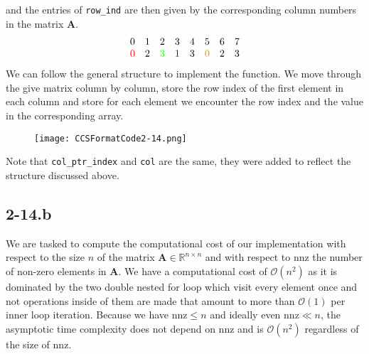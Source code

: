 \documentclass{article}
\begin{document}
and the entries of \verb|row_ind| are then given by the corresponding column numbers in the matrix $\mathbf{A}$.
\begin{equation*}
    \begin{matrix}
        0 & 1 & 2 & 3 & 4 & 5 & 6 & 7 \\
        \color{red}0\color{black} & 2 & \color{green}3\color{black} & \color{blue}1\color{black} & 3 & \color{orange}0\color{black} & 2 & 3
    \end{matrix}
\end{equation*}
We can follow the general structure to implement the function. We move through the give matrix column by column, store the row index of the first element in each column and store for each element we encounter the row index and the value in the corresponding array.
\begin{figure}[!hbt]
    \centering
\texttt{[image: CCSFormatCode2-14.png]}
\end{figure}

\noindent Note that \verb|col_ptr_index| and \verb|col| are the same, they were added to reflect the structure discussed above.
\subsection*{2-14.b}
We are tasked to compute the computational cost of our implementation with respect to the size $n$ of the matrix $\mathbf{A}\in \mathbb{R}^{n \times n}$ and with respect to $\mathrm{nnz}$ the number of non-zero elements in $\mathbf{A}$. We have a computational cost of $\mathcal{O}\left(n^{2}\right)$ as it is dominated by the two double nested for loop which visit every element once and not operations inside of them are made that amount to more than $\mathcal{O}\left(1\right)$ per inner loop iteration. Because we have $\mathrm{nnz} \leq n$ and ideally even $\mathrm{nnz} \ll n$, the asymptotic time complexity does not depend on $\mathrm{nnz}$ and is $\mathcal{O}\left(n^{2}\right)$ regardless of the size of $\mathrm{nnz}$.
\end{document}
